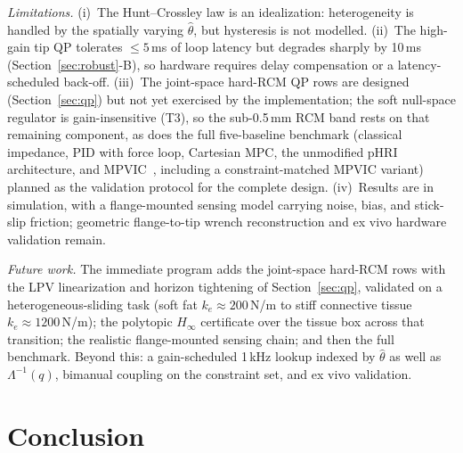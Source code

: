\emph{Limitations.} (i)~The Hunt--Crossley law is an idealization: heterogeneity is handled by the spatially varying $\hat\theta$, but hysteresis is not modelled. (ii)~The high-gain tip QP tolerates $\le5$\,ms of loop latency but degrades sharply by 10\,ms (Section~\ref{sec:robust}-B), so hardware requires delay compensation or a latency-scheduled back-off. (iii)~The joint-space hard-RCM QP rows are designed (Section~\ref{sec:qp}) but not yet exercised by the implementation; the soft null-space regulator is gain-insensitive (T3), so the sub-0.5\,mm RCM band rests on that remaining component, as does the full five-baseline benchmark (classical impedance, PID with force loop, Cartesian MPC, the unmodified pHRI architecture, and MPVIC~\cite{roveda2025}, including a constraint-matched MPVIC variant) planned as the validation protocol for the complete design. (iv)~Results are in simulation, with a flange-mounted sensing model carrying noise, bias, and stick-slip friction; geometric flange-to-tip wrench reconstruction and ex vivo hardware validation remain.

\emph{Future work.} The immediate program adds the joint-space hard-RCM rows with the LPV linearization and horizon tightening of Section~\ref{sec:qp}, validated on a heterogeneous-sliding task (soft fat $k_e\approx200$\,N/m to stiff connective tissue $k_e\approx1200$\,N/m); the polytopic $H_\infty$ certificate over the tissue box across that transition; the realistic flange-mounted sensing chain; and then the full benchmark. Beyond this: a gain-scheduled 1\,kHz lookup indexed by $\hat\theta$ as well as $\Lambda^{-1}(q)$, bimanual coupling on the constraint set, and ex vivo validation.

\section{Conclusion}\label{sec:conclusion}


